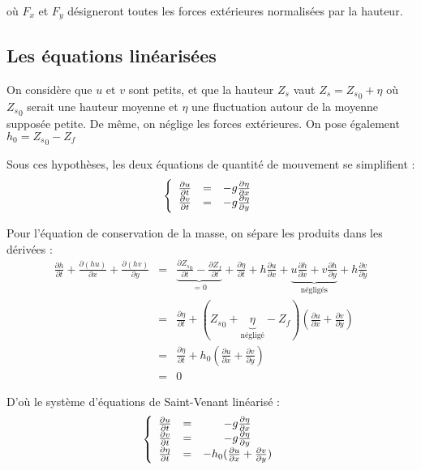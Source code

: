 où $F_x$ et $F_y$ désigneront toutes les forces extérieures normalisées par la hauteur. \\

\subsection{Les équations linéarisées}

On considère que $u$ et $v$ sont petits, et que la hauteur $Z_s$ vaut $Z_s={Z_s}_0+\eta$ où ${Z_s}_0$ serait une hauteur moyenne et $\eta$ une fluctuation autour de la moyenne supposée petite. De même, on néglige les forces extérieures. On pose également $h_0 = {Z_s}_0 - Z_f$

Sous ces hypothèses, les deux équations de quantité de mouvement se simplifient :
\[\left\{\begin{array}{c c c}
	\frac{\partial u}{\partial t} &=& -g\frac{\partial \eta}{\partial x} \\
	\frac{\partial v}{\partial t} &=& -g\frac{\partial \eta}{\partial y} 
\end{array}\right.\]

Pour l'équation de conservation de la masse, on sépare les produits dans les dérivées :
\begin{eqnarray*}
	\frac{\partial h}{\partial t} + \frac{\partial (hu)}{\partial x} + \frac{\partial (hv)}{\partial y} &=& \underbrace{\frac{\partial {Z_s}_0}{\partial t} - \frac{\partial Z_f}{\partial t}}_{=0} + \frac{\partial \eta}{\partial t} + h\frac{\partial u}{\partial x} + \underbrace{u \frac{\partial h}{\partial x} + v\frac{\partial h}{\partial y}}_{\text{négligés}} + h\frac{\partial v}{\partial y} \\
	     &=&\frac{\partial \eta}{\partial t} + ({Z_s}_0 + \underbrace{\eta}_{\text{négligé}} - Z_f)\left(\frac{\partial u}{\partial x} + \frac{\partial v}{\partial y} \right) \\
	     &=&\frac{\partial \eta}{\partial t} + h_0\left(\frac{\partial u}{\partial x} + \frac{\partial v}{\partial y} \right) \\
		&=& 0
\end{eqnarray*}

D'où le système d'équations de Saint-Venant linéarisé :
\begin{equation}\label{II-4-4}
	\left\{ 
	\begin{array}{c c c}
		\frac{\partial u}{\partial t}	& = & -g \frac{\partial \eta}{\partial x}\\
		\frac{\partial v}{\partial t} & = & -g  \frac{\partial \eta}{\partial y}\\
      \frac{\partial \eta}{\partial t} & = & - h_0  (\frac{\partial u}{\partial x}+\frac{\partial v}{\partial y} )\\
		
		
	\end{array}
	\right.
\end{equation}
